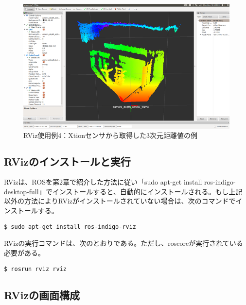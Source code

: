 \begin{figure}[h]
  \centering
  \includegraphics[width=\columnwidth]{pictures/chapter5/pic_05_04.png}
  \caption{RViz使用例4：Xtionセンサから取得した3次元距離値の例}
\end{figure}

\subsection{RVizのインストールと実行}

RVizは、ROSを第2章で紹介した方法に従い「sudo apt-get install ros-indigo-desktop-full」でインストールすると、自動的にインストールされる。もし上記以外の方法によりRVizがインストールされていない場合は、次のコマンドでインストールする。

\vspace{\baselineskip}
\begin{lstlisting}[language=ROS]
$ sudo apt-get install ros-indigo-rviz
\end{lstlisting}

RVizの実行コマンドは、次のとおりである。ただし、roscoreが実行されている必要がある。

\vspace{\baselineskip}
\begin{lstlisting}[language=ROS]
$ rosrun rviz rviz
\end{lstlisting}

\subsection{RVizの画面構成}

